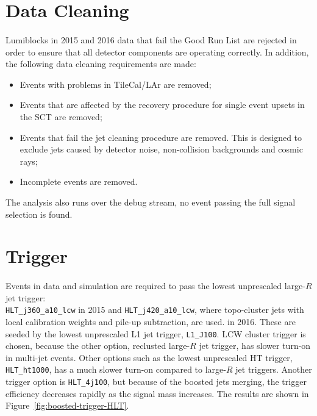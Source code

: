 \section{Data Cleaning}
\label{evt-sel:cleaning}
\paragraph{}
Lumiblocks in 2015 and 2016 data that fail the Good Run List are rejected in order to ensure that all detector components are operating correctly. In addition, the following data cleaning requirements are made:
\begin{itemize}
\item Events with problems in TileCal/LAr are removed;
\item Events that are affected by the recovery procedure for single event upsets in the SCT are removed;
\item Events that fail the jet cleaning procedure are removed. This is designed to exclude jets caused by detector noise, non-collision backgrounds and cosmic rays;
\item Incomplete events are removed.
\end{itemize}
The analysis also runs over the debug stream, no event passing the full signal selection is found.


\section{Trigger}
\label{evt-sel:trig}
\paragraph{}
Events in data and simulation are required to pass the lowest unprescaled large-$R$ jet trigger: \\
\verb|HLT_j360_a10_lcw| in 2015 and \verb|HLT_j420_a10_lcw|, where topo-cluster jets with local calibration weights and pile-up subtraction, are used. in 2016. These are seeded by the lowest unprescaled L1 jet trigger, \texttt{L1\_J100}. LCW cluster trigger is chosen, because the other option, reclusted large-$R$ jet trigger, has slower turn-on in multi-jet events. Other options such as the lowest unprescaled HT trigger, \verb|HLT_ht1000|, has a much slower turn-on compared to large-$R$ jet triggers. Another trigger option is \verb|HLT_4j100|, but because of the boosted jets merging, the trigger efficiency decreases rapidly as the signal mass increases. The results are shown in Figure~\ref{fig:boosted-trigger-HLT}.

